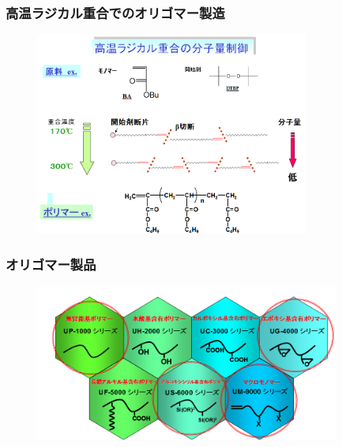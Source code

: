 \documentclass[12pt, dvipdfmx]{beamer}
\begin{document}
%
\begin{frame}
	\frametitle{高温ラジカル重合でのオリゴマー製造}
		\begin{figure}[!b]
			\begin{center}
				\includegraphics[width=90mm]{Mw_seigyo.png}
			\end{center}
		\end{figure}
		\end{frame}
		\begin{frame}\frametitle{オリゴマー製品}
		\begin{figure}[!b]
			\begin{center}
				\includegraphics[width=100mm]{seihin.png}
			\end{center}
		\end{figure}
\end{frame}
\end{document}
